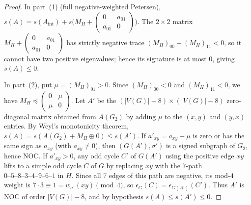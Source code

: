 \documentclass[10pt,letterpaper]{article}
\theoremstyle{zetaplain}
\theoremstyle{zetadef}
\theoremstyle{remark}
\numberwithin{equation}{section}
\begin{document}
\begin{proof}
In part~(1) (full negative-weighted Petersen), $s(A) = s(A_{\mathrm{int}}) + s\bigl(M_H + \begin{pmatrix} 0 & a_{01} \\ a_{01} & 0 \end{pmatrix}\bigr)$. The $2 \times 2$ matrix $M_H + \begin{pmatrix} 0 & a_{01} \\ a_{01} & 0 \end{pmatrix}$ has strictly negative trace $(M_H)_{00} + (M_H)_{11} < 0$, so it cannot have two positive eigenvalues; hence its signature is at most $0$, giving $s(A) \le 0$.

In part~(2), put $\mu = (M_H)_{01} > 0$. Since $(M_H)_{00} < 0$ and $(M_H)_{11} < 0$, we have $M_H \preceq \begin{pmatrix} 0 & \mu \\ \mu & 0 \end{pmatrix}$. Let $A'$ be the $(|V(G)| - 8) \times (|V(G)| - 8)$ zero-diagonal matrix obtained from $A(G_2)$ by adding $\mu$ to the $(x, y)$ and $(y, x)$ entries. By Weyl's monotonicity theorem, $s(A) = s(A(G_2) + M_H \oplus 0) \le s(A')$. If $a'_{xy} = a_{xy} + \mu$ is zero or has the same sign as $a_{xy}$ (with $a_{xy} \ne 0$), then $(G(A'), \sigma')$ is a signed subgraph of $G_2$, hence NOC. If $a'_{xy} > 0$, any odd cycle $C'$ of $G(A')$ using the positive edge $xy$ lifts to a simple odd cycle $C$ of $G$ by replacing $xy$ with the $7$-path $0\text{--}5\text{--}8\text{--}3\text{--}4\text{--}9\text{--}6\text{--}1$ in $H$. Since all $7$ edges of this path are negative, its mod-$4$ weight is $7 \cdot 3 \equiv 1 = w_{\sigma'}(xy) \pmod 4$, so $\epsilon_G(C) = \epsilon_{G(A')}(C')$. Thus $A'$ is NOC of order $|V(G)| - 8$, and by hypothesis $s(A) \le s(A') \le 0$.


\end{proof}
\end{document}
